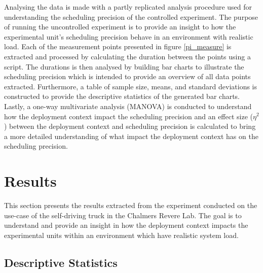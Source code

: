 Analysing the data is made with a partly replicated analysis procedure used for understanding the scheduling precision of the controlled experiment. The purpose of running the uncontrolled experiment is to provide an insight to how the experimental unit's scheduling precision behave in an environment with realistic load. Each of the measurement points presented in figure \ref{pi_measure} is extracted and processed by calculating the duration between the points using a script. The durations is then analysed by building bar charts to illustrate the scheduling precision which is intended to provide an overview of all data points extracted. Furthermore, a table of sample size, means, and standard deviations is constructed to provide the descriptive statistics of the generated bar charts. Lastly, a one-way multivariate analysis (MANOVA) is conducted to understand how the deployment context impact the scheduling precision and an effect size ($\eta^{2}$) between the deployment context and scheduling precision is calculated to bring a more detailed understanding of what impact the deployment context has on the scheduling precision.\\



\section{Results}
\label{section:results-usecase-experiment}

This section presents the results extracted from the experiment conducted on the use-case of the self-driving truck in the Chalmers Revere Lab. The goal is to understand and provide an insight in how the deployment context impacts the experimental units within an environment which have realistic system load.\\


\subsection{Descriptive Statistics}

